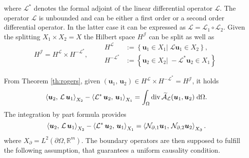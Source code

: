 \begin{assumption}
	where $\mathcal{L}^*$ denotes the formal adjoint of the linear differential operator $\mathcal{L}$.
	The operator $\mathcal{L}$ is unbounded and  can be either a first order or a second order differential operator. In the latter case it can be expressed as $\mathcal{L} = \mathcal{L}_1 \circ \mathcal{L}_2$. Given the splitting $X_1 \times X_2 = X$ the Hilbert space $H^\mathcal{J}$ can be split as well as 
	\begin{equation}
		H^\mathcal{J} = H^\mathcal{L} \times H^\mathcal{-L^*}, \qquad
		\begin{aligned}
		H^\mathcal{L} &:= \left\{\bm{u}_1 \in X_1 \vert \; \mathcal{L}\bm{u}_1 \in X_2 \right\}, \\
		H^\mathcal{-L^*} &:= \left\{\bm{u}_2 \in X_2 \vert \; -\mathcal{L}^*\bm{u}_2 \in X_1 \right\}
		\end{aligned}
	\end{equation}
\end{assumption}

From Theorem \ref{th:rogers}, given $(\bm{u}_1, \, \bm{u}_2) \in H^\mathcal{L} \times H^\mathcal{-L^*}= H^{\mathcal{J}}$, it holds
\begin{equation}
\inner[X_2]{\bm{u}_2}{\mathcal{L}\, \bm{u}_1}  - \inner[X_1]{\mathcal{L}^* \, \bm{u}_2} {\bm{u}_1} = \int_{\Omega }\div\widetilde{\mathcal{A}}_{\mathcal{L}}(\bm{u}_1, \bm{u}_2) \d\Omega. \\
\end{equation}
The integration by part formula provides 
\begin{equation}
\inner[X_2]{\bm{u}_2}{\mathcal{L}\,\bm{u}_1} - \inner[X_1]{\mathcal{L}^* \, \bm{u}_2}{\bm{u}_1} = \inner[X_\partial]{\mathcal{N}_{\partial, 1} \bm{u}_1}{\mathcal{N}_{\partial, 2} \bm{u}_2}. \label{eq:intbypartsJ} 
\end{equation}
where $X_\partial = L^2(\partial \Omega, \mathbb{R}^m)$. The boundary operators are then supposed to fulfill the following assumption, that guarantees a uniform causality condition.


